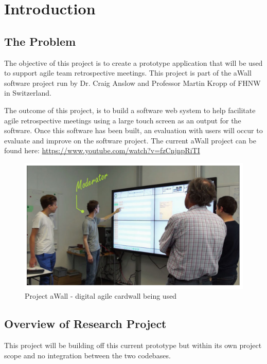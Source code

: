 \chapter{Introduction}\label{C:intro}
\section{The Problem} 
The objective of this project is to create a prototype application that will be used to support agile team retrospective meetings. This project is part of the aWall software project run by Dr. Craig Anslow and Professor Martin Kropp of FHNW in Switzerland.

The outcome of this project, is to build a software web system to help facilitate agile retrospective meetings using a large touch screen as an output for the software. Once this software has been built, an evaluation with users will occur to evaluate and improve on the software project. The current aWall project can be found here: \url{https://www.youtube.com/watch?v=fzCnjnpRiTI}

\begin{figure}[ht]
\centering
\includegraphics{aWall_introduction}
\caption{Project aWall - digital agile cardwall being used}
\end{figure}
\section{Overview of Research Project}
This project will be building off this current prototype but within its own project scope and no integration between the two codebases.

